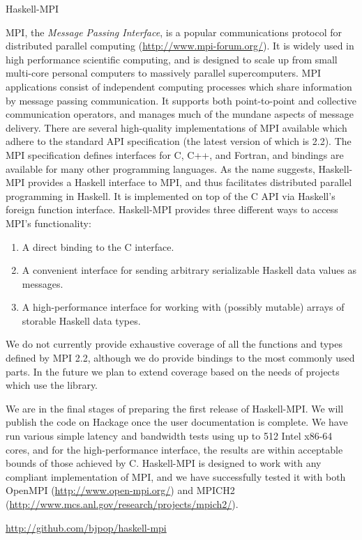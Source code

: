 \begin{hcarentry}[new]{Haskell-MPI}
\label{haskell-mpi}
\makeheader

MPI, the \emph{Message Passing Interface}, is a popular communications protocol
for distributed parallel computing (\url{http://www.mpi-forum.org/}). It is widely
used in high performance scientific computing, and is designed to scale up from
small multi-core personal computers to massively parallel supercomputers.
MPI applications
consist of independent computing processes which share information by message passing
communication. It supports both point-to-point and collective communication operators,
and manages much of the mundane aspects of message delivery. There are several
high-quality implementations of MPI available which adhere to the standard API
specification (the latest version of which is 2.2). The MPI specification defines
interfaces for C, C++, and Fortran, and bindings are available for many other
programming languages. As the name suggests, Haskell-MPI provides a Haskell interface
to MPI, and thus facilitates distributed parallel programming in Haskell. It is implemented
on top of the C API via Haskell's foreign function interface. Haskell-MPI provides
three different ways to access MPI's functionality:
\begin{enumerate}
   \item A direct binding to the C interface.
   \item A convenient interface for sending arbitrary serializable Haskell data values as messages.
   \item A high-performance interface for working with (possibly mutable) arrays of storable
         Haskell data types.
\end{enumerate}
We do not currently provide exhaustive coverage of all the functions and types defined by MPI
2.2, although we do provide bindings to the most commonly used parts. In the future we plan
to extend coverage based on the needs of projects which use the library.

We are in the final stages of preparing the first release of Haskell-MPI. We will
publish the code on Hackage once the user documentation is complete.
We have run various simple latency and bandwidth tests using up to 512 Intel x86-64 cores, and
for the high-performance interface, the results are within acceptable bounds of those
achieved by C.
Haskell-MPI is designed to work with any compliant implementation of MPI, and we
have successfully tested it with both OpenMPI (\url{http://www.open-mpi.org/}) and
MPICH2 (\url{http://www.mcs.anl.gov/research/projects/mpich2/}).

\FurtherReading
  \url{http://github.com/bjpop/haskell-mpi}
\end{hcarentry}
